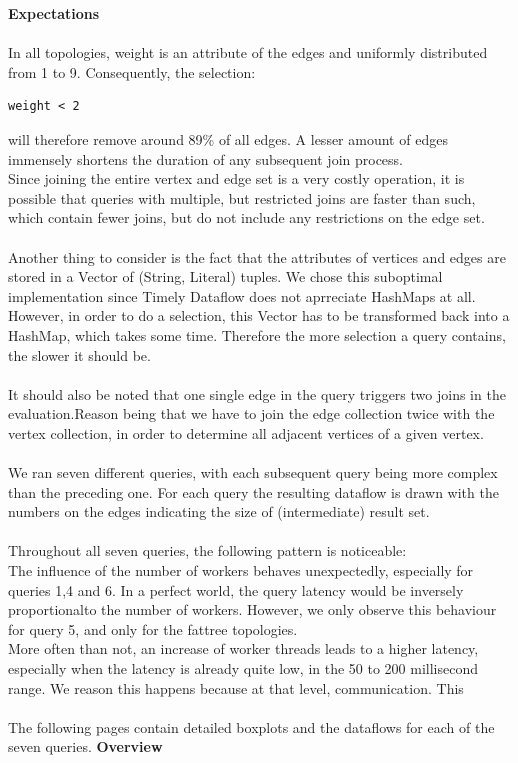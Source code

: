 \documentclass[11pt,singlecolumn]{scrartcl}
\begin{document}
\textbf{Expectations}\\\\
In all topologies, weight is an attribute of the edges and uniformly distributed from 1 to 9. Consequently, the selection: \begin{verbatim}weight < 2\end{verbatim} will therefore remove around 89\% of all edges. A lesser amount of edges immensely shortens the duration of any subsequent join process.\\ Since joining the entire vertex and edge set is a very costly operation, it is possible that queries with multiple, but restricted joins are faster than such, which contain fewer joins, but do not include any restrictions on the edge set. \\\\
Another thing to consider is the fact that the attributes of vertices and edges are stored in a Vector of (String, Literal) tuples. We chose this suboptimal implementation since Timely Dataflow does not aprreciate HashMaps at all. However, in order to do a selection, this Vector has to be transformed back into a HashMap, which takes some time. Therefore the more selection a query contains, the slower it should be.\\\\
It should also be noted that one single edge in the query triggers two joins in the evaluation.Reason being that we have to join the edge collection twice with the vertex collection, in order to determine all adjacent vertices of a given vertex.\\\\
We ran seven different queries, with each subsequent query being more complex than the preceding one. For each query the resulting dataflow is drawn with the numbers on the edges indicating the size of (intermediate) result set.\\\\
Throughout all seven queries, the following pattern is noticeable:\\
The influence of the number of workers behaves unexpectedly, especially for queries 1,4 and 6. In a perfect world, the query latency would be inversely proportionalto the number of workers. However, we only observe this behaviour for query 5, and only for the fattree topologies.\\More often than not, an increase of worker threads leads to a higher latency, especially when the latency is already quite low, in the 50 to 200 millisecond range. We reason this happens because at that level, communication. This \\\\
The following pages contain detailed boxplots and the dataflows for each of the seven queries.
\textbf{Overview}
\end{document}
